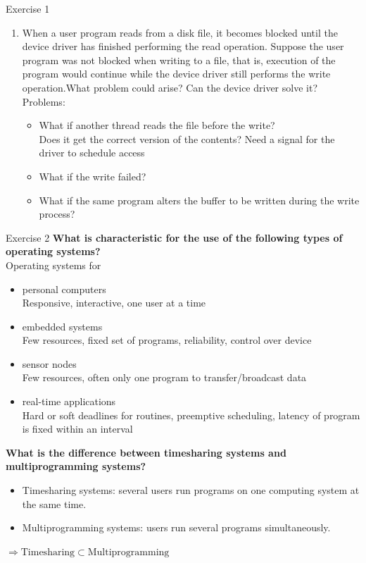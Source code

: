 \documentclass[10pt]{beamer}
\begin{document}
\begin{frame}[allowframebreaks]{Exercise 1}
\begin{enumerate}
		\item When a user program reads from a disk file, it becomes blocked until the device driver has finished performing the read operation. Suppose the user program was not blocked when writing to a file, that is, execution of the program would continue while the device driver still performs the write operation.What problem could arise? Can the device driver solve it? \\
		\framebreak
		Problems:
		\begin{itemize}
		 \item What if another thread reads the file before the write?\\
		 Does it get the correct version of the contents? Need a signal for the driver to schedule access
		 \item What if the write failed?
		 \item What if the same program alters the buffer to be written during the write process?
		\end{itemize}
	\end{enumerate}
\end{frame}

\begin{frame}[allowframebreaks]{Exercise 2}
\textbf{What is characteristic for the use of the following types of operating systems?} \\
Operating systems for
\begin{itemize}
 \item personal computers \\
 Responsive, interactive, one user at a time
 \item embedded systems \\
 Few resources, fixed set of programs, reliability, control over device
 \item sensor nodes \\
 Few resources, often only one program to transfer/broadcast data
 \item real-time applications \\
 Hard or soft deadlines for routines, preemptive scheduling, latency of program is fixed within an interval
\end{itemize}
\textbf{What is the difference between timesharing systems and multiprogramming systems?} \\
\begin{itemize}
 \item Timesharing systems: several users run programs on one computing system at the same time.
 \item Multiprogramming systems: users run several programs simultaneously.
\end{itemize}
$\Rightarrow \text{Timesharing} \subset \text{Multiprogramming}$
\end{frame}
\end{document}

